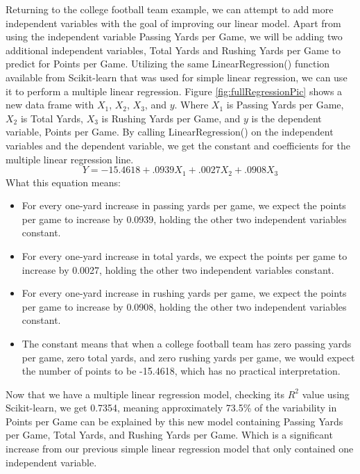 \documentclass[a4paper,12pt]{report}
\begin{document}
Returning to the college football team example, we can attempt to add more independent variables with the goal of improving our linear model. Apart from using the independent variable Passing Yards per Game, we will be adding two additional independent variables, Total Yards and Rushing Yards per Game to predict for Points per Game. Utilizing the same LinearRegression() function available from Scikit-learn that was used for simple linear regression, we can use it to perform a multiple linear regression. Figure \ref{fig:fullRegressionPic} shows a new data frame with $X_1$, $X_2$, $X_3$, and $y$. Where $X_1$ is Passing Yards per Game, $X_2$ is Total Yards, $X_3$ is Rushing Yards per Game, and $y$ is the dependent variable, Points per Game. By calling LinearRegression() on the independent variables and the dependent variable, we get the constant and coefficients for the multiple linear regression line.
$$Y=-15.4618+.0939X_1+.0027X_2+.0908X_3$$
What this equation means:
\vspace*{-.9cm}
\begin{itemize}[,]
    \setlength\itemsep{-.1cm}
    \item For every one-yard increase in passing yards per game, we expect the points per game to increase by 0.0939, holding the other two independent variables constant.
    \item For every one-yard increase in total yards, we expect the points per game to increase by 0.0027, holding the other two independent variables constant.
    \item For every one-yard increase in rushing yards per game, we expect the points per game to increase by 0.0908, holding the other two independent variables constant.
    \item The constant means that when a college football team has zero passing yards per game, zero total yards, and zero rushing yards per game, we would expect the number of points to be -15.4618, which has no practical interpretation. 
\end{itemize}

Now that we have a multiple linear regression model, checking its $R^2$ value using Scikit-learn, we get 0.7354, meaning approximately 73.5\% of the variability in Points per Game can be explained by this new model containing Passing Yards per Game, Total Yards, and Rushing Yards per Game. Which is a significant increase from our previous simple linear regression model that only contained one independent variable. 
\end{document}
